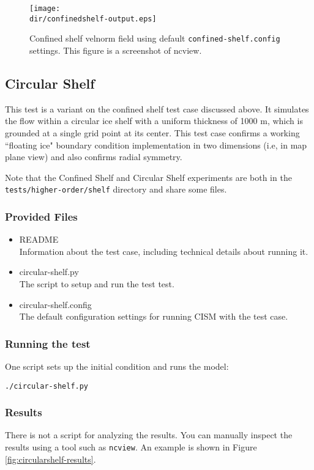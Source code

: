 \begin{figure}[H!]
	\centering
	\texttt{[image: \\dir/confinedshelf-output.eps]}
	\caption{Confined shelf velnorm field using default \texttt{confined-shelf.config} settings. This figure is a screenshot of ncview.}
	\label{fig:confinedshelf-results}
\end{figure}
\FloatBarrier

\subsection{Circular Shelf}
This test is a variant on the confined shelf test case discussed above. It simulates the flow within a circular ice shelf with a uniform thickness
of 1000 m, which is grounded at a single grid point at its center. This test case confirms a working ``floating ice" boundary condition implementation
in two dimensions (i.e, in map plane view) and also confirms radial symmetry. 

Note that the Confined Shelf and Circular Shelf experiments are both in the 
\texttt{tests/higher-order/shelf} directory and share some files.

\subsubsection{Provided Files}

\begin{itemize}
	\item README \\
		Information about the test case, including technical details about running it.
	\item circular-shelf.py \\
		The script to setup and run the test test.
	\item circular-shelf.config \\
  The default configuration settings for running CISM with the test case.
\end{itemize}

\subsubsection{Running the test}
One script sets up the initial condition and runs the model:

\texttt{./circular-shelf.py}

\subsubsection{Results}
There is not a script for analyzing the results.
You can manually inspect the results using a tool such as \texttt{ncview}.
An example is shown in Figure \ref{fig:circularshelf-results}.

